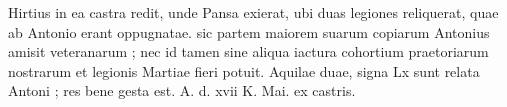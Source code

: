  Hirtius in ea castra redit, unde Pansa exierat, ubi duas legiones reliquerat, quae ab Antonio erant oppugnatae. sic partem maiorem suarum copiarum Antonius amisit veteranarum ; nec id tamen sine aliqua iactura cohortium praetoriarum nostrarum et legionis Martiae fieri potuit. Aquilae duae, signa Lx sunt relata Antoni ; res bene gesta est. A. d. xvii K. Mai. ex castris.
